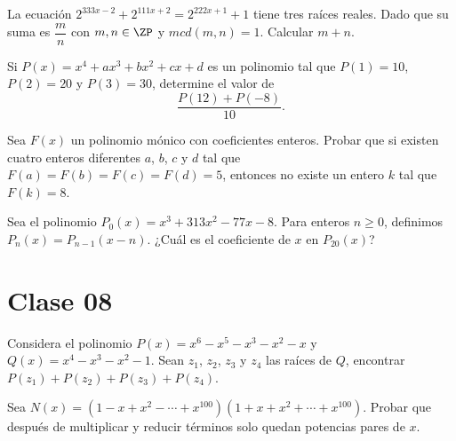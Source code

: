     \begin{section-problem}
        La ecuación $2^{333x - 2} + 2^{111x + 2} = 2^{222x + 1} + 1$ tiene tres raíces reales.
        Dado que su suma es $\dfrac{m}{n}$ con $m, n \in \ZP$ y $mcd(m, n) = 1$.
        Calcular $m + n$.
    \end{section-problem}

    \begin{section-problem}
        Si $P(x) = x^4 + ax^3 + bx^2 + cx + d$ es un polinomio tal que $P(1) = 10$, $P(2) = 20$ y $P(3) = 30$, determine el valor de
        \[\frac{P(12) + P(-8)}{10}.\]
    \end{section-problem}

    \begin{section-problem}
        Sea $F(x)$ un polinomio mónico con coeficientes enteros.
        Probar que si existen cuatro enteros diferentes $a$, $b$, $c$ y $d$ tal que $F(a) = F(b) = F(c)  = F(d) = 5$,
        entonces no existe un entero $k$ tal que $F(k) = 8$.
    \end{section-problem}

    \begin{section-problem}
        Sea el polinomio $P_0(x) = x^3 + 313x^2 - 77x - 8$.
        Para enteros $n \geq 0$, definimos $P_n(x) = P_{n - 1}(x - n)$.
        ¿Cuál es el coeficiente de $x$ en $P_{20}(x)$?
    \end{section-problem}



\section{Clase 08}

\begin{section-problem}
    Considera el polinomio $P(x) = x^6 - x^5 - x^3 - x^2 - x$ y $Q(x) = x^4 - x^3 - x^2 - 1$.
    Sean $z_1$, $z_2$, $z_3$ y $z_4$ las raíces de $Q$, encontrar $P(z_1) + P(z_2) + P(z_3) + P(z_4)$.
\end{section-problem}

\begin{section-problem}
    Sea $N(x) = (1 - x + x^2 - \cdots + x^{100})(1 + x + x^2 + \cdots + x^{100})$.
    Probar que después de multiplicar y reducir términos solo quedan potencias pares de $x$.
\end{section-problem}

